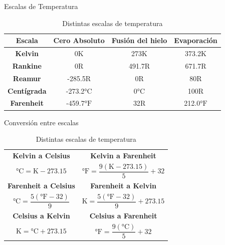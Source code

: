 \documentclass[aspectratio=169]{beamer}
\begin{document}
\begin{frame}{Escalas de Temperatura}
\begin{table}[c]
    \centering
    \begin{tabular}{cccc}
        \toprule
        \textbf{Escala} & \textbf{Cero Absoluto} &\textbf{Fusión del hielo} & \textbf{Evaporación} \\
        \midrule
        \textbf{Kelvin} & 0$\si{\kelvin}$ & 273$\si{\kelvin}$ & 373.2$\si{\kelvin}$ \\
        \textbf{Rankine} & 0$\mathrm{R}$ & 491.7$\mathrm{R}$ & 671.7$\mathrm{R}$ \\
        \textbf{Reamur} & -285.5$\mathrm{R}$ & 0$\mathrm{R}$ & 80$\mathrm{R}$ \\
        \textbf{Centígrada} & -273.2$\si{\celsius}$ & 0$\si{\celsius}$ & 100$\mathrm{R}$ \\
        \textbf{Farenheit} & -459.7$\si{\degree}\mathrm{F}$ & 32$\mathrm{R}$ & 212.0$\si{\degree}\mathrm{F}$ \\
        \bottomrule
    \end{tabular}
    \caption{Distintas escalas de temperatura \cite{cengel2003termodinamica}} 
    \label{tab:limites}
\end{table}
\end{frame}

\begin{frame}{Conversión entre escalas}
\setlength{\extrarowheight}{4pt}
\begin{table}[c]
    \centering
    \begin{tabular}{|c|c|}
        \hline
        \textbf{Kelvin a Celsius} & \textbf{Kelvin a Farenheit}\\
        \Large{$\si{\celsius}=\si{\kelvin}-273.15$} & \Large{$\si{\degree}\mathrm{F}=\dfrac{9(\si{\kelvin}-273.15)}{5}+32$}\\[10pt]
        \hline
        \textbf{Farenheit a Celsius} & \textbf{Farenheit a Kelvin} \\
        \Large{$\si{\celsius}=\dfrac{5(\si{\degree}\mathrm{F}-32)}{9}$ } & \Large{$\si{\kelvin}=\dfrac{5(\si{\degree}\mathrm{F}-32)}{9}+273.15$}\\[10pt]
        \hline
        \textbf{Celsius a Kelvin} & \textbf{Celsius a Farenheit} \\
        \Large{$\si{\kelvin}=\si{\celsius}+273.15$ } & \Large{$\si{\degree}\mathrm{F}=\dfrac{9(\si{\celsius})}{5}+32$}\\[10pt]
        \hline
    \end{tabular}
    \caption{Distintas escalas de temperatura \cite{cengel2003termodinamica}}
    \label{tab:conversion}
\end{table}
\end{frame}
\end{document}
